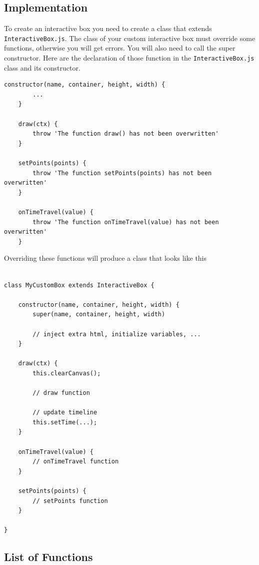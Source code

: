 \documentclass{article}
\begin{document}
\subsection{Implementation}

To create an interactive box you need to create a class that extends \texttt{InteractiveBox.js}.
The class of your custom interactive box must override some functions, otherwise you will get errors.
You will also need to call the super constructor.
Here are the declaration of those function in the \texttt{InteractiveBox.js} class and its constructor.

\medskip

\begin{lstlisting}[style=js]
    constructor(name, container, height, width) {
        ...
    }

    draw(ctx) {
        throw 'The function draw() has not been overwritten'
    }

    setPoints(points) {
        throw 'The function setPoints(points) has not been overwritten'
    }

    onTimeTravel(value) {
        throw 'The function onTimeTravel(value) has not been overwritten'
    }
\end{lstlisting}

Overriding these functions will produce a class that looks like this

\begin{lstlisting}[style=js]

class MyCustomBox extends InteractiveBox {

    constructor(name, container, height, width) {
        super(name, container, height, width)

        // inject extra html, initialize variables, ...
    }

    draw(ctx) {
        this.clearCanvas();

        // draw function

        // update timeline
        this.setTime(...);
    }

    onTimeTravel(value) {
        // onTimeTravel function
    }

    setPoints(points) {
        // setPoints function
    }

}
\end{lstlisting}

\pagebreak

\subsection{List of Functions}
\end{document}
